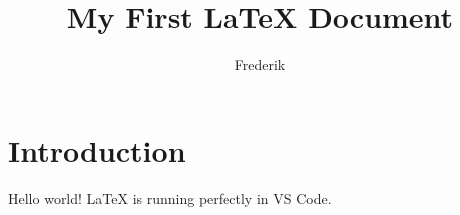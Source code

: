 \documentclass{article}
\title{My First LaTeX Document}
\author{Frederik}
\begin{document}
\maketitle
\section{Introduction}
Hello world! LaTeX is running perfectly in VS Code.
\end{document}
